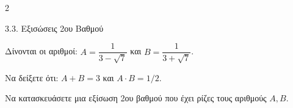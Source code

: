 \begin{ylh}{2}
    \item 3.3. Εξισώσεις 2ου Βαθμού
\end{ylh}
Δίνονται οι αριθμοί: $A = \dfrac{1}{3 - \sqrt{7}}$ και $B = \dfrac{1}{3 + \sqrt{7}}$.

\begin{alist}
\item Να δείξετε ότι: $A + B = 3$ και $A \cdot B = 1/2$. 
\item Να κατασκευάσετε μια εξίσωση 2{ου} βαθμού που έχει ρίζες τους αριθμούς $A, B$. 
\end{alist}

